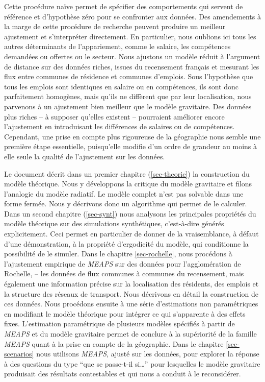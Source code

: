 \documentclass[
  10pt,
  a4paper,
  numbers=noendperiod,
  DIV=9]{scrreprt}
\begin{document}
Cette procédure naïve permet de spécifier des comportements qui servent
de référence et d'hypothèse zéro pour se confronter aux données. Des
amendements à la marge de cette procédure de recherche peuvent produire
un meilleur ajustement et s'interpréter directement. En particulier,
nous oublions ici tous les autres déterminants de l'appariement, comme
le salaire, les compétences demandées ou offertes ou le secteur. Nous
ajustons un modèle réduit à l'argument de distance sur des données
riches, issues du recensement français et mesurant les flux entre
communes de résidence et communes d'emplois. Sous l'hypothèse que tous
les emplois sont identiques en salaire ou en compétences, ils sont donc
parfaitement homogènes, mais qu'ils ne diffèrent que par leur
localisation, nous parvenons à un ajustement bien meilleur que le modèle
gravitaire. Des données plus riches -- à supposer qu'elles existent --
pourraient améliorer encore l'ajustement en introduisant les différences
de salaires ou de compétences. Cependant, une prise en compte plus
rigoureuse de la géographie nous semble une première étape essentielle,
puisqu'elle modifie d'un ordre de grandeur au moins à elle seule la
qualité de l'ajustement sur les données.

Le document décrit dans un premier chapitre (\ref{sec-theorie}) la
construction du modèle théorique. Nous y développons la critique du
modèle gravitaire et filons l'analogie du modèle radiatif. Le modèle
complet n'est pas solvable dans une forme fermée. Nous y décrivons donc
un algorithme qui permet de le calculer. Dans un second chapitre
(\ref{sec-synt}) nous analysons les principales propriétés du modèle
théorique sur des simulations synthétiques, c'est-à-dire générés
explicitement. Ceci permet en particulier de donner de la vraisemblance,
à défaut d'une démonstration, à la propriété d'ergodicité du modèle, qui
conditionne la possibilité de le simuler. Dans le chapitre
\ref{sec-rochelle}, nous procédons à l'ajustement empirique de
\emph{MEAPS} sur des données pour l'agglomération de Rochelle, -- les
données de flux communes à communes du recensement, mais également une
information précise sur la localisation des résidents, des emplois et la
structure des réseaux de transport. Nous décrivons en détail la
construction de ces données. Nous procédons ensuite à une série
d'estimations non paramétriques en modifiant le modèle théorique pour
intégrer ce qui s'apparente à des effets fixes. L'estimation
paramétrique de plusieurs modèles spécifiés à partir de \emph{MEAPS} et
du modèle gravitaire permet de conclure à la supériorité de la famille
\emph{MEAPS} quant à la prise en compte de la géographie. Dans le
chapitre \ref{sec-scenarios} nous utilisons \emph{MEAPS}, ajusté sur les
données, pour explorer la réponse à des questions du type ``que se
passe-t-il si\ldots{}'' pour lesquelles le modèle gravitaire produisait
des résultats contestables et qui nous a conduit à le reconsidérer.
\end{document}
